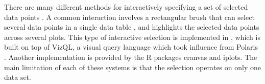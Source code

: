 \documentclass[12pt]{article}\usepackage[]{graphicx}\usepackage[]{color}
\begin{document}
There are many different methods for interactively specifying a set of
selected data points \citep{scented-widgets, heer2008generalized}. A
common interaction involves a rectangular brush that can select
several data points in a single data table \citep{cleveland,
  brushing-scatterplots}, and highlights the selected data points
across several plots. 
This type of interactive selection is implemented in 
\citet{tableau}, which is built on top of VizQL, a visual query
language which took influence from Polaris \citep{polaris}.
Another implementation is provided by the R packages cranvas and
iplots. The main limitation of each of these systems is that the
selection operates on only one data set.



\end{document}
